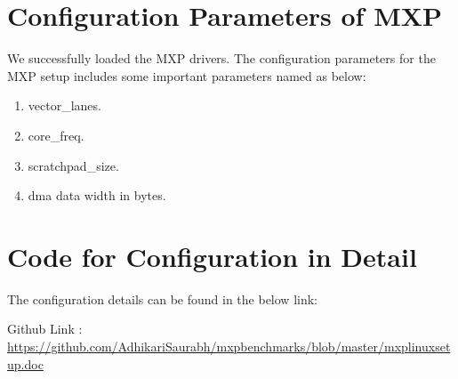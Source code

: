 \section{Configuration Parameters of MXP}
We successfully loaded the MXP drivers. The configuration parameters for the MXP setup includes some important parameters named as below:
\begin{enumerate}

	\item vector\_lanes.

	\item core\_freq.

	\item scratchpad\_size.

	\item dma data width in bytes.
 
\end{enumerate}




\section{Code for Configuration in Detail}

The configuration details can be found in the below link:

Github Link : \url{https://github.com/AdhikariSaurabh/mxpbenchmarks/blob/master/mxplinuxsetup.doc}

